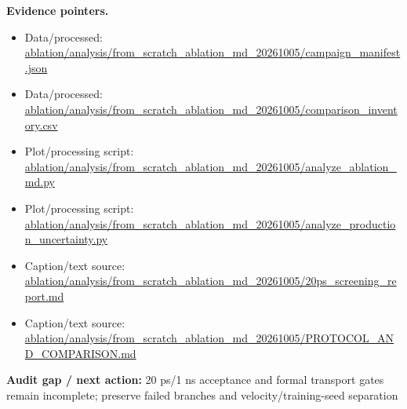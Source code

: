 \documentclass[10pt]{article}
\newcommand{\statusline}[1]{\colorbox{gray!12}{\parbox{0.96\linewidth}{#1}}}
\begin{document}
\textbf{Evidence pointers.}
\begin{itemize}[leftmargin=1.4em,noitemsep]
\item Data/processed: \begingroup\scriptsize\url{ablation/analysis/from_scratch_ablation_md_20261005/campaign_manifest.json}\endgroup
\item Data/processed: \begingroup\scriptsize\url{ablation/analysis/from_scratch_ablation_md_20261005/comparison_inventory.csv}\endgroup
\item Plot/processing script: \begingroup\scriptsize\url{ablation/analysis/from_scratch_ablation_md_20261005/analyze_ablation_md.py}\endgroup
\item Plot/processing script: \begingroup\scriptsize\url{ablation/analysis/from_scratch_ablation_md_20261005/analyze_production_uncertainty.py}\endgroup
\item Caption/text source: \begingroup\scriptsize\url{ablation/analysis/from_scratch_ablation_md_20261005/20ps_screening_report.md}\endgroup
\item Caption/text source: \begingroup\scriptsize\url{ablation/analysis/from_scratch_ablation_md_20261005/PROTOCOL_AND_COMPARISON.md}\endgroup
\end{itemize}
\statusline{\textbf{Audit gap / next action:} 20 ps/1 ns acceptance and formal transport gates remain incomplete; preserve failed branches and velocity/training-seed separation}
\vfill
\clearpage
\end{document}
